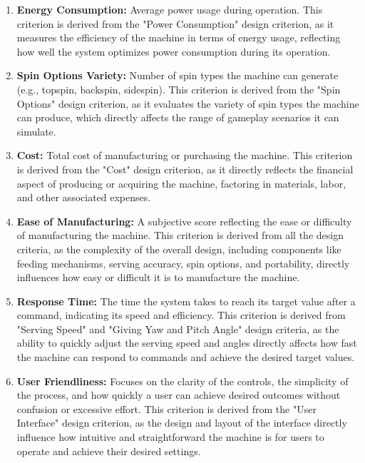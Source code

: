 \documentclass[12pt]{article}
\begin{document}
\begin{enumerate}
    \item \textbf{Energy Consumption:} Average power usage during operation. This criterion is derived from the "Power Consumption" design criterion, as it measures the efficiency of the machine in terms of energy usage, reflecting how well the system optimizes power consumption during its operation.

    \item \textbf{Spin Options Variety:} Number of spin types the machine can generate (e.g., topspin, backspin, sidespin). This criterion is derived from the "Spin Options" design criterion, as it evaluates the variety of spin types the machine can produce, which directly affects the range of gameplay scenarios it can simulate.

    \item \textbf{Cost:} Total cost of manufacturing or purchasing the machine. This criterion is derived from the "Cost" design criterion, as it directly reflects the financial aspect of producing or acquiring the machine, factoring in materials, labor, and other associated expenses.

    \item \textbf{Ease of Manufacturing:} A subjective score reflecting the ease or difficulty of manufacturing the machine. This criterion is derived from all the design criteria, as the complexity of the overall design, including components like feeding mechanisms, serving accuracy, spin options, and portability, directly influences how easy or difficult it is to manufacture the machine.

    \item \textbf{Response Time:} The time the system takes to reach its target value after a command, indicating its speed and efficiency. This criterion is derived from "Serving Speed" and "Giving Yaw and Pitch Angle" design criteria, as the ability to quickly adjust the serving speed and angles directly affects how fast the machine can respond to commands and achieve the desired target values.


    \item \textbf{User Friendliness:} Focuses on the clarity of the controls, the simplicity of the process, and how quickly a user can achieve desired outcomes without confusion or excessive effort. This criterion is derived from the "User Interface" design criterion, as the design and layout of the interface directly influence how intuitive and straightforward the machine is for users to operate and achieve their desired settings.



\end{enumerate}
\end{document}
